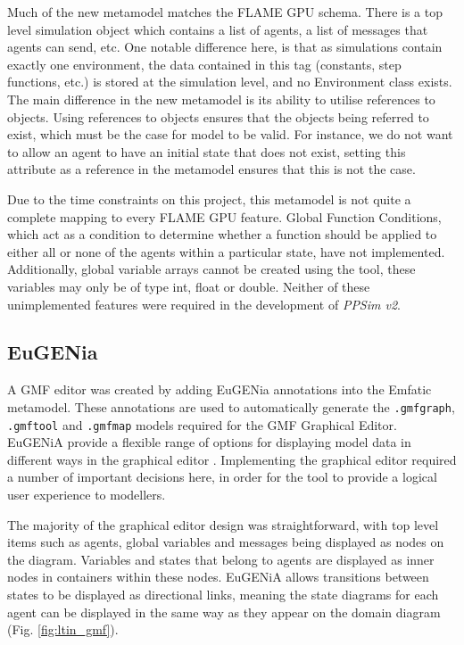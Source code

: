 \documentclass{UoYCSproject}
\begin{document}
Much of the new metamodel matches the \gls{FLAME GPU} schema.
There is a top level simulation object which contains a list of agents, a list of messages that agents can send, etc.
One notable difference here, is that as simulations contain exactly one environment, the data contained in this tag (constants, step functions, etc.) is stored at the simulation level, and no Environment class exists.
The main difference in the new metamodel is its ability to utilise references to objects.
Using references to objects ensures that the objects being referred to exist, which must be the case for model to be valid.
For instance, we do not want to allow an agent to have an initial state that does not exist, setting this attribute as a reference in the metamodel ensures that this is not the case.

Due to the time constraints on this project, this metamodel is not quite a complete mapping to every \gls{FLAME GPU} feature.
Global Function Conditions, which act as a condition to determine whether a function should be applied to either all or none of the agents within a particular state, have not implemented.
Additionally, global variable arrays cannot be created using the tool, these variables may only be of type int, float or double.
Neither of these unimplemented features were required in the development of \textit{PPSim v2}.

\subsection{EuGENia}
A GMF editor was created by adding EuGENia annotations into the Emfatic metamodel.
These annotations are used to automatically generate the \texttt{.gmfgraph}, \texttt{.gmftool} and \texttt{.gmfmap} models required for the GMF Graphical Editor.
EuGENiA provide a flexible range of options for displaying model data in different ways in the graphical editor \cite{epsilon_book}.
Implementing the graphical editor required a number of important decisions here, in order for the tool to provide a logical user experience to modellers.

The majority of the graphical editor design was straightforward, with top level items such as agents, global variables and messages being displayed as nodes on the diagram.
Variables and states that belong to agents are displayed as inner nodes in containers within these nodes.
EuGENiA allows transitions between states to be displayed as directional links, meaning the state diagrams for each agent can be displayed in the same way as they appear on the domain diagram (Fig. \ref{fig:ltin_gmf}).
\end{document}
